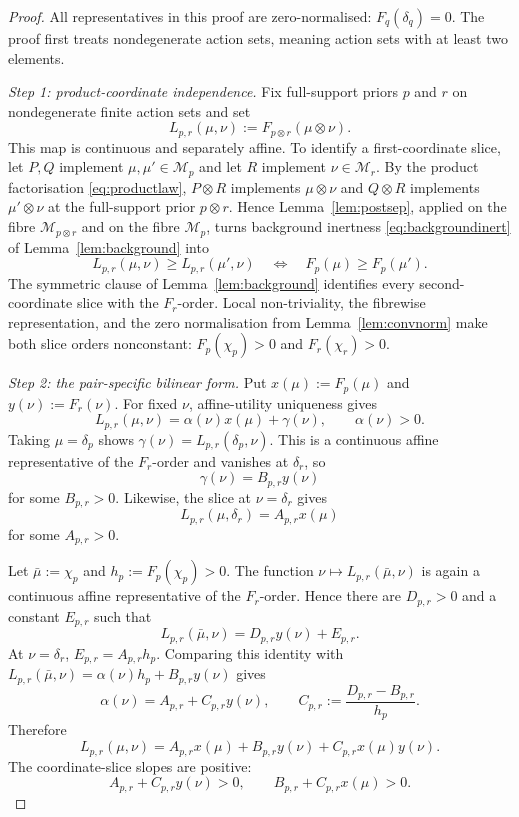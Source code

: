 \documentclass[11pt,a4paper]{article}
\theoremstyle{definition}
\newcommand{\1}{\mathbf 1}
\begin{document}
\begin{proof}
All representatives in this proof are zero-normalised: $F_q(\delta_q)=0$.  The proof first treats nondegenerate action
sets, meaning action sets with at least two elements.

\emph{Step 1: product-coordinate independence.}
Fix full-support priors $p$ and $r$ on nondegenerate finite action sets and set
\[
L_{p,r}(\mu,\nu):=F_{p\otimes r}(\mu\otimes\nu).
\]
This map is continuous and separately affine.  To identify a first-coordinate slice, let $P,Q$ implement
$\mu,\mu'\in\mathcal M_p$ and let $R$ implement $\nu\in\mathcal M_r$.  By the product factorisation
\eqref{eq:productlaw}, $P\otimes R$ implements $\mu\otimes\nu$ and $Q\otimes R$ implements $\mu'\otimes\nu$ at the
full-support prior $p\otimes r$.  Hence Lemma~\ref{lem:postsep}, applied on the fibre $\mathcal M_{p\otimes r}$ and on
the fibre $\mathcal M_p$, turns background inertness
\eqref{eq:backgroundinert} of Lemma~\ref{lem:background} into
\[
L_{p,r}(\mu,\nu)\ge L_{p,r}(\mu',\nu)
\quad\Longleftrightarrow\quad
F_p(\mu)\ge F_p(\mu').
\]
The symmetric clause of Lemma~\ref{lem:background} identifies every second-coordinate slice with the $F_r$-order.  Local non-triviality, the
fibrewise representation, and the zero normalisation from Lemma~\ref{lem:convnorm} make both slice orders nonconstant:
$F_p(\chi_p)>0$ and $F_r(\chi_r)>0$.

\emph{Step 2: the pair-specific bilinear form.}
Put $x(\mu):=F_p(\mu)$ and $y(\nu):=F_r(\nu)$.  For fixed $\nu$, affine-utility uniqueness gives
\[
L_{p,r}(\mu,\nu)=\alpha(\nu)x(\mu)+\gamma(\nu),
\qquad \alpha(\nu)>0.
\]
Taking $\mu=\delta_p$ shows $\gamma(\nu)=L_{p,r}(\delta_p,\nu)$.  This is a continuous affine representative of the
$F_r$-order and vanishes at $\delta_r$, so
\[
\gamma(\nu)=B_{p,r}y(\nu)
\]
for some $B_{p,r}>0$.  Likewise, the slice at $\nu=\delta_r$ gives
\[
L_{p,r}(\mu,\delta_r)=A_{p,r}x(\mu)
\]
for some $A_{p,r}>0$.

Let $\bar\mu:=\chi_p$ and $h_p:=F_p(\chi_p)>0$.  The function
$\nu\mapsto L_{p,r}(\bar\mu,\nu)$ is again a continuous affine representative of the $F_r$-order.  Hence there are
$D_{p,r}>0$ and a constant $E_{p,r}$ such that
\[
L_{p,r}(\bar\mu,\nu)=D_{p,r}y(\nu)+E_{p,r}.
\]
At $\nu=\delta_r$, $E_{p,r}=A_{p,r}h_p$.  Comparing this identity with
$L_{p,r}(\bar\mu,\nu)=\alpha(\nu)h_p+B_{p,r}y(\nu)$ gives
\[
\alpha(\nu)=A_{p,r}+C_{p,r}y(\nu),
\qquad
C_{p,r}:=\frac{D_{p,r}-B_{p,r}}{h_p}.
\]
Therefore
\begin{equation}
L_{p,r}(\mu,\nu)
=A_{p,r}x(\mu)+B_{p,r}y(\nu)+C_{p,r}x(\mu)y(\nu).
\tag{BIL}\label{eq:pairbilinear}
\end{equation}
The coordinate-slice slopes are positive:
\[
A_{p,r}+C_{p,r}y(\nu)>0,
\qquad
B_{p,r}+C_{p,r}x(\mu)>0.
\]


\end{proof}
\end{document}
